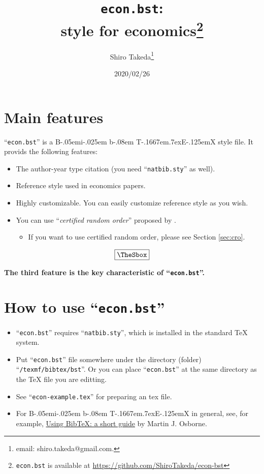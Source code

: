 \documentclass[10pt]{article}
\title{\texttt{econ.bst}:\\
\BibTeX{} style for economics\thanks{\texttt{econ.bst} is available at
\url{https://github.com/ShiroTakeda/econ-bst}}
}
\author{Shiro Takeda\thanks{email: {\ttfamily shiro.takeda@gmail.com}.}}
\date{2020/02/26}
\newenvironment{Frame}%
{\setlength{\fboxsep}{15pt}
\setlength{\mylength}{\linewidth}%
\addtolength{\mylength}{-2\fboxsep}%
\addtolength{\mylength}{-2\fboxrule}%
\Sbox
\minipage{\mylength}%
\setlength{\abovedisplayskip}{0pt}%
\setlength{\belowdisplayskip}{0pt}%
}%
{\endminipage\endSbox
\[\fbox{\TheSbox}\]}
\def\BibTeX{{\rm B\kern-.05em{\sc i\kern-.025em b}\kern-.08em
    T\kern-.1667em\lower.7ex\hbox{E}\kern-.125emX}}
\begin{document}
\maketitle

\newlength{\mylength}
\setlength{\fboxsep}{15pt}
\setlength{\mylength}{\linewidth}
\addtolength{\mylength}{-2\fboxsep}
\addtolength{\mylength}{-2\fboxrule}

\tableofcontents


\setlength{\baselineskip}{16pt}

\section{Main features}

``\texttt{econ.bst}'' is a \BibTeX{} style file. It provids the following
features:
\begin{Frame}
 \begin{itemize}
  \item The author-year type citation (you need ``\texttt{natbib.sty}'' as well).
  \item Reference style used in economics papers.
  \item Highly customizable.  You can easily customize reference style as you
        wish.
  \item You can use ``\textit{certified random order}'' proposed by
        \href{http://dx.doi.org/10.1257/aer.20161492}{\citet[][AER]{10.1257/aer.20161492}}.
        \begin{itemize}
         \item If you want to use certified random order, please see Section
               \ref{sec:cro}.
        \end{itemize}
 \end{itemize}
\end{Frame}

\textbf{The third feature is the key characteristic of ``\texttt{econ.bst}''.}

\section{How to use ``\texttt{econ.bst}''}

\begin{itemize}
 \item ``\texttt{econ.bst}'' requires ``\texttt{natbib.sty}'', which is
       installed in the standard \TeX{} system.
 \item Put ``\texttt{econ.bst}'' file somewhere under the directory (folder)
       ``\texttt{/texmf/bibtex/bst}''. Or you can place ``\texttt{econ.bst}'' at
       the same directory as the \TeX{} file you are editting.
 \item See ``\texttt{econ-example.tex}'' for preparing an tex file.
 \item For \BibTeX{} in general, see, for example,
       \href{https://www.economics.utoronto.ca/osborne/latex/BIBTEX.HTM}{Using
       BibTeX: a short guide} by Martin J. Osborne.
\end{itemize}
\end{document}

